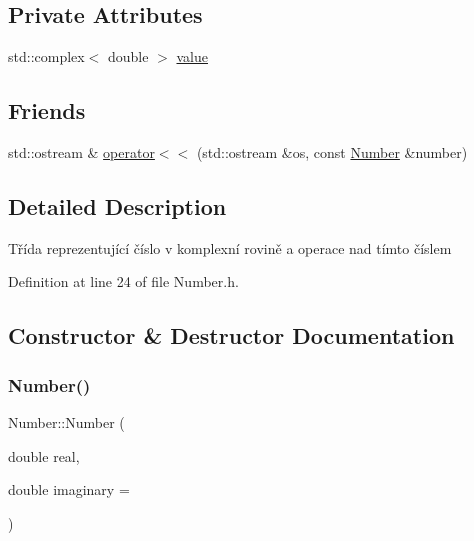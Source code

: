 \subsection*{Private Attributes}
\begin{DoxyCompactItemize}
\item 
std\+::complex$<$ double $>$ \hyperlink{classteam22_1_1_math_1_1_number_a596bb514d860fbbcec3f114c3f73a59b}{value}
\end{DoxyCompactItemize}
\subsection*{Friends}
\begin{DoxyCompactItemize}
\item 
std\+::ostream \& \hyperlink{classteam22_1_1_math_1_1_number_a658f07a59742bbb5ce6432e2fd244e8b}{operator$<$$<$} (std\+::ostream \&os, const \hyperlink{classteam22_1_1_math_1_1_number}{Number} \&number)
\end{DoxyCompactItemize}


\subsection{Detailed Description}
Třída reprezentující číslo v komplexní rovině a operace nad tímto číslem 

Definition at line 24 of file Number.\+h.



\subsection{Constructor \& Destructor Documentation}
\mbox{\label{classteam22_1_1_math_1_1_number_a62b054aca95b93f5f36afb938223d54c}} 
\subsubsection{\texorpdfstring{Number()}{Number()}\hspace{0.1cm}{\footnotesize\ttfamily [1/2]}}
{\footnotesize\ttfamily Number\+::\+Number (\begin{DoxyParamCaption}\item[{double}]{real,  }\item[{double}]{imaginary = {} }\end{DoxyParamCaption})}



